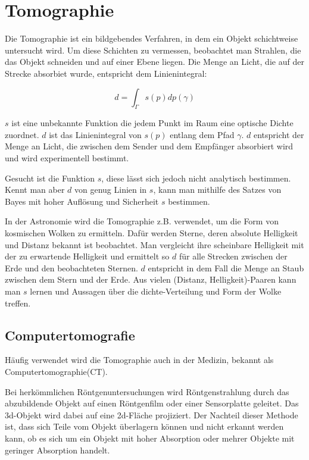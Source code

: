 \section{Tomographie}\label{k4.2.comptomo.ct}

Die Tomographie ist ein bildgebendes Verfahren, in dem ein Objekt schichtweise untersucht wird. Um diese Schichten zu vermessen, beobachtet man Strahlen, die das Objekt schneiden und auf einer Ebene liegen. Die Menge an Licht, die auf der Strecke absorbiet wurde, entspricht dem Linienintegral:

$$d=\int_{\Gamma}{}s(p)dp(\gamma)$$

$s$ ist eine unbekannte Funktion die jedem Punkt im Raum eine optische Dichte zuordnet. $d$ ist das Linienintegral von $s(p)$ entlang dem Pfad $\gamma$. $d$ entspricht der Menge an Licht, die zwischen dem Sender und dem Empfänger absorbiert wird und wird experimentell bestimmt.

Gesucht ist die Funktion $s$, diese lässt sich jedoch nicht analytisch bestimmen. Kennt man aber $d$ von genug Linien in $s$, kann man mithilfe des Satzes von Bayes mit hoher Auflösung und Sicherheit $s$ bestimmen.

In der Astronomie wird die Tomographie z.B. verwendet, um die Form von kosmischen Wolken zu ermitteln. Dafür werden Sterne, deren absolute Helligkeit und Distanz bekannt ist beobachtet. Man vergleicht ihre scheinbare Helligkeit mit der zu erwartende Helligkeit und ermittelt so $d$ für alle Strecken zwischen der Erde und den beobachteten Sternen. $d$ entspricht in dem Fall die Menge an Staub zwischen dem Stern und der Erde. Aus vielen (Distanz, Helligkeit)-Paaren kann man $s$ lernen und Aussagen über die dichte-Verteilung und Form der Wolke treffen.

\subsection{Computertomografie}

Häufig verwendet wird die Tomographie auch in der Medizin, bekannt als Computertomographie(CT).

Bei herkömmlichen Röntgenuntersuchungen wird Röntgenstrahlung durch das abzubildende Objekt auf einen Röntgenfilm oder einer Sensorplatte geleitet. Das 3d-Objekt wird dabei auf eine 2d-Fläche projiziert. Der Nachteil dieser Methode ist, dass sich Teile vom Objekt überlagern können und nicht erkannt werden kann, ob es sich um ein Objekt mit hoher Absorption oder mehrer Objekte mit geringer Absorption handelt.

